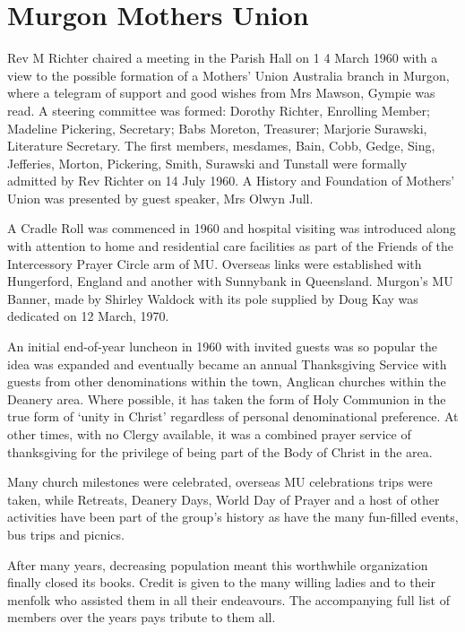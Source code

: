 \section{Murgon Mothers Union}



Rev M Richter chaired a meeting in the Parish Hall on 1 4 March 1960 with a view to the possible formation of a Mothers' Union Australia branch in Murgon, where a telegram of support and good wishes from Mrs Mawson, Gympie was read. A steering committee was formed: Dorothy Richter, Enrolling Member; Madeline Pickering, Secretary; Babs Moreton, Treasurer; Marjorie Surawski, Literature Secretary. The first members, mesdames, Bain, Cobb, Gedge, Sing, Jefferies, Morton, Pickering, Smith, Surawski and Tunstall were formally admitted by Rev Richter on 14 July 1960. A History and Foundation of Mothers' Union was presented by guest speaker, Mrs Olwyn Jull.



A Cradle Roll was commenced in 1960 and hospital visiting was introduced along with attention to home and residential care facilities as part of the Friends of the Intercessory Prayer Circle arm of MU. Overseas links were established with Hungerford, England and another with Sunnybank in Queensland. Murgon's MU Banner, made by Shirley Waldock with its pole supplied by Doug Kay was dedicated on 12 March, 1970.



An initial end-of-year luncheon in 1960 with invited guests was so popular the idea was expanded and eventually became an annual Thanksgiving Service with guests from other denominations within the town, Anglican churches within the Deanery area. Where possible, it has taken the form of Holy Communion in the true form of `unity in Christ' regardless of personal denominational preference. At other times, with no Clergy available, it was a combined prayer service of thanksgiving for the privilege of being part of the Body of Christ in the area.



Many church milestones were celebrated, overseas MU celebrations trips were taken, while Retreats, Deanery Days, World Day of Prayer and a host of other activities have been part of the group's history as have the many fun-filled events, bus trips and picnics.



After many years, decreasing population meant this worthwhile organization finally closed its books. Credit is given to the many willing ladies and to their menfolk who assisted them in all their endeavours. The accompanying full list of members over the years pays tribute to them all.









